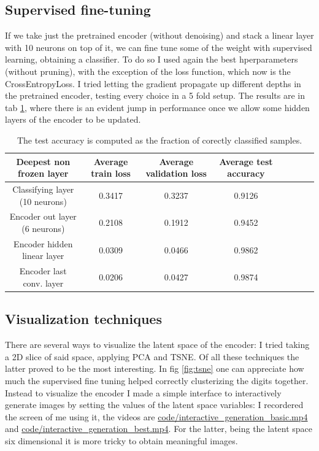 \documentclass[a4paper, 11pt]{article}
\begin{document}
  \subsection{Supervised fine-tuning}
    If we take just the pretrained encoder (without denoising) and stack a linear layer with 10 neurons on top of it, we can fine tune some of the weight with supervised learning, obtaining a classifier. To do so I used again the best hperparameters (without pruning), with the exception of the loss function, which now is the CrossEntropyLoss. I tried letting the gradient propagate up different depths in the pretrained encoder, testing every choice in a 5 fold setup. The results are in tab \ref{tab:sup_ft}, where there is an evident jump in performance once we allow some hidden layers of the encoder to be updated.

    \begin{table}[H]
      \centering
      \begin{tabular}{c|ccccccc}
        Deepest non frozen layer & Average train loss & Average validation loss & Average test accuracy \\
        \midrule
        Classifying layer (10 neurons) & 0.3417 & 0.3237 & 0.9126 \\
        Encoder out layer (6 neurons) & 0.2108 & 0.1912 & 0.9452 \\
        Encoder hidden linear layer & 0.0309 & 0.0466 & 0.9862 \\
        Encoder last conv. layer & 0.0206 & 0.0427 & 0.9874 \\
        \bottomrule
      \end{tabular}
      \caption{The test accuracy is computed as the fraction of corectly classified samples.}
      \label{tab:sup_ft}
    \end{table}



  \subsection{Visualization techniques}
    There are several ways to visualize the latent space of the encoder: I tried taking a 2D slice of said space, applying PCA and TSNE. Of all these techniques the latter proved to be the most interesting. In fig \ref{fig:tsne} one can appreciate how much the supervised fine tuning helped correctly clusterizing the digits together. Instead to visualize the encoder I made a simple interface to interactively generate images by setting the values of the latent space variables: I recordered the screen of me using it, the videos are \url{code/interactive_generation_basic.mp4} and \url{code/interactive_generation_best.mp4}. For the latter, being the latent space six dimensional it is more tricky to obtain meaningful images.
\end{document}
